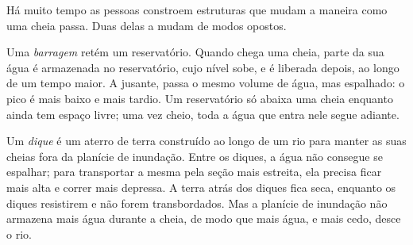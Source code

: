 Há muito tempo as pessoas constroem estruturas que mudam a maneira como uma
cheia passa. Duas delas a mudam de modos opostos.

Uma \emph{barragem} retém um reservatório. Quando chega uma cheia, parte da
sua água é armazenada no reservatório, cujo nível sobe, e é liberada depois,
ao longo de um tempo maior. A jusante, passa o mesmo volume de água, mas
espalhado: o pico é mais baixo e mais tardio. Um reservatório só abaixa uma
cheia enquanto ainda tem espaço livre; uma vez cheio, toda a água que entra
nele segue adiante.

Um \emph{dique} é um aterro de terra construído ao longo de um rio para
manter as suas cheias fora da planície de inundação. Entre os diques, a água
não consegue se espalhar; para transportar a mesma  pela seção mais
estreita, ela precisa ficar mais alta e correr mais depressa. A terra atrás
dos diques fica seca, enquanto os diques resistirem e não forem
transbordados. Mas a planície de inundação não armazena mais água durante a
cheia, de modo que mais água, e mais cedo, desce o rio.

